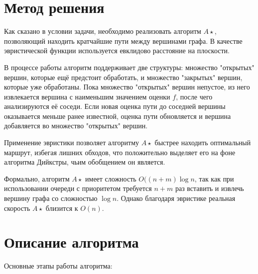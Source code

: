 \documentclass[12pt]{article}
\begin{document}
\newpage
\section*{Метод решения}
Как сказано в условии задачи, необходимо реализовать алгоритм $A\star$, позволяющий находить кратчайшие пути между вершинами графа. В качестве эвристической функции используется евклидово расстояние на плоскости.

В процессе работы алгоритм поддерживает две структуры: множество "открытых" вершин, которые ещё предстоит обработать, и множество "закрытых" вершин, которые уже обработаны. Пока множество "открытых" вершин непустое, из него извлекается вершина с наименьшим значением оценки $f$, после чего анализируются её соседи. Если новая оценка пути до соседней вершины оказывается меньше ранее известной, оценка пути обновляется и вершина добавляется во множество "открытых" вершин.

Применение эвристики позволяет алгоритму $A\star$ быстрее находить оптимальный маршрут, избегая лишних обходов, что положительно выделяет его на фоне алгоритма Дийкстры, чьим обобщением он является.

Формально, алгоритм $A\star$ имеет сложность $O((n + m)\log{n}$, так как при использовании очереди с приоритетом требуется $n + m$ раз вставить и извлечь вершину графа со сложностью $\log{n}$. Однако благодаря эвристике реальная скорость $A\star$ близится к $O(n)$.

\newpage
\section*{Описание алгоритма}
Основные этапы работы алгоритма:
\end{document}
